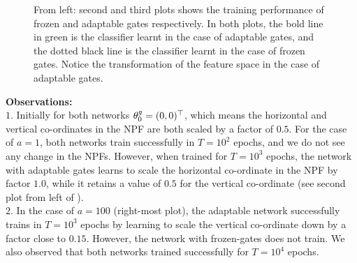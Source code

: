\begin{figure}[!b]
\caption{From left: second and third plots shows the training performance of frozen and adaptable gates respectively. In both plots, the bold line in green is the classifier learnt in the case of adaptable gates, and the dotted black line is the classifier learnt in the case of frozen gates. Notice the transformation of the feature space in the case of adaptable gates.}
\label{fig:feat}
\end{figure}
\textbf{Observations:}\\
$1.$ Initially for both networks $\theta^g_0=(0,0)^\top$, which means the horizontal and vertical co-ordinates in the NPF are both scaled by a factor of $0.5$. For the case of $a=1$, both networks train successfully in $T=10^2$ epochs, and we do not see any change in the NPFs. However, when trained for $T=10^3$ epochs, the network with adaptable gates learns to scale the horizontal co-ordinate in the NPF by factor $1.0$, while it retains a value of $0.5$ for the vertical co-ordinate (see second plot from left of ).\\
$2.$ In the case of $a=100$ (right-most plot), the adaptable network successfully trains in $T=10^3$ epochs by learning to scale the vertical co-ordinate down by a factor close to $0.15$. However, the network with frozen-gates does not train. We also observed that both networks trained successfully for $T=10^4$ epochs.

